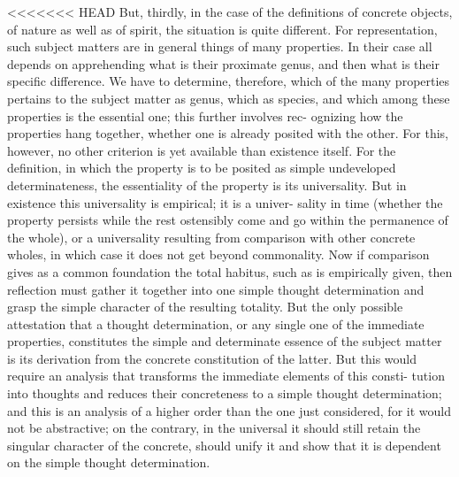 <<<<<<< HEAD
But, thirdly, in the case of the definitions of concrete objects,
of nature as well as of spirit, the situation is quite different.
For representation, such subject matters are in general things of many properties. In their case all depends
on apprehending what is their proximate genus, and then what is their
specific difference. We have to determine, therefore, which of the many
properties pertains to the subject matter as genus, which as species, and
which among these properties is the essential one; this further involves rec-
ognizing how the properties hang together, whether one is already posited
with the other. For this, however, no other criterion is yet available than
existence itself.
For the definition, in which the property is to be posited
as simple undeveloped determinateness, the essentiality of the property is
its universality. But in existence this universality is empirical; it is a univer-
sality in time (whether the property persists while the rest ostensibly come
and go within the permanence of the whole), or a universality resulting
from comparison with other concrete wholes, in which case it does not get
beyond commonality. Now if comparison gives as a common foundation
the total habitus, such as is empirically given, then reflection must gather
it together into one simple thought determination and grasp the simple
character of the resulting totality. But the only possible attestation that
a thought determination, or any single one of the immediate properties,
constitutes the simple and determinate essence of the subject matter is
its derivation from the concrete constitution of the latter. But this would
require an analysis that transforms the immediate elements of this consti-
tution into thoughts and reduces their concreteness to a simple thought
determination; and this is an analysis of a higher order than the one just
considered, for it would not be abstractive; on the contrary, in the universal
it should still retain the singular character of the concrete, should unify it
and show that it is dependent on the simple thought determination.

